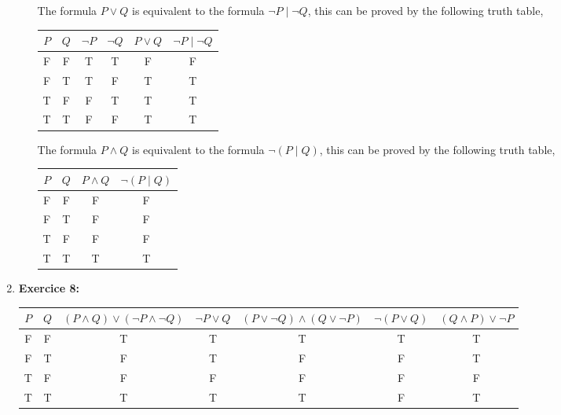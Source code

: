 \documentclass{article} %
\begin{document}
\begin{enumerate}
\begin{itemize}
        The formula $P \lor Q$ is equivalent to the formula $\neg P \mid \neg Q$, this can be proved by the following truth table,
        \begin{center}
        \begin{tabular}{cccccc}
            $P$ & $Q$ & $\neg P$ & $\neg Q$ & $P \lor Q$ & $\neg P \mid \neg Q$ \\
            \hline
            F & F & T & T & F & F \\
            F & T & T & F & T & T \\
            T & F & F & T & T & T \\
            T & T & F & F & T & T \\
        \end{tabular}
        \end{center}

        The formula $P \land Q$ is equivalent to the formula $\neg (P \mid Q)$, this can be proved by the following truth table,

        \begin{center}
        \begin{tabular}{cccc}
            $P$ & $Q$ & $P \land Q$ & $\neg (P \mid Q)$ \\
            \hline
            F & F & F & F \\
            F & T & F & F \\
            T & F & F & F \\
            T & T & T & T \\
        \end{tabular}
        \end{center}

    \end{itemize}

    \item \textbf{Exercice 8:}
    \begin{center}
    \begin{tabular}{ccccccc}
        $P$ & $Q$ & $(P \land Q) \lor (\neg P \land \neg Q)$ & $\neg P \lor Q$ & $(P \lor \neg Q) \land (Q \lor \neg P)$ & $\neg (P \lor Q)$ & $(Q \land P) \lor \neg P$ \\
        \hline
        F & F & T & T & T & T & T \\
        F & T & F & T & F & F & T \\
        T & F & F & F & F & F & F \\
        T & T & T & T & T & F & T \\
    \end{tabular}
    \end{center}


\end{enumerate}
\end{document}
